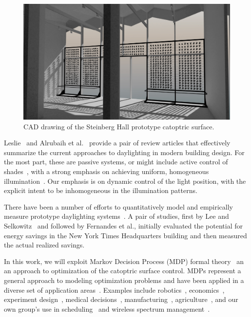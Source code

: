 \begin{figure}[ht]
\centering
\includegraphics[width=0.8\linewidth]{figures/steinberg2}
\caption{CAD drawing of the Steinberg Hall prototype catoptric surface.}
\label{fig:steinberg2}
\end{figure}

Leslie~\cite{Leslie03} and Alrubaih et al.~\cite{azaise13} provide
a pair of review articles that effectively summarize the current
approaches to daylighting in modern building design.
For the most part, these are passive systems, or might include
active control of shades~\cite{kt16}, with a strong emphasis on
achieving uniform, homogeneous illumination~\cite{bwkk15,gb16}.
Our emphasis is on dynamic control of the light position, with the explicit
intent to be inhomogeneous in the illumination patterns.

There have been a number of efforts to quantitatively model and
empirically measure prototype daylighting
systems~\cite{bwkk15,fsdm14,ls06,vgf+13}. A pair of studies, first by
Lee and Selkowitz~\cite{ls06} and followed by Fernandes et al.\cite{fsdm14},
initially evaluated the potential for energy savings in the New York Times
Headquarters building and then measured the actual realized savings.

In this work, we will exploit Markov Decision Process (MDP)
formal theory~\cite{puterman} an an approach to optimization of the
catoptric surface control. MDPs represent a general approach
to modeling optimization problems and have been applied in a diverse set of
application areas~\cite{White93}. Examples include robotics~\cite{ab10}, 
economics~\cite{bs98}, experiment design~\cite{kb85},
medical decisions~\cite{ahsr10}, manufacturing~\cite{yyl04},
agriculture~\cite{Kristensen03},
and our own group's use in scheduling~\cite{gtsg08,tggs10}
and wireless spectrum management~\cite{mgc16}.

